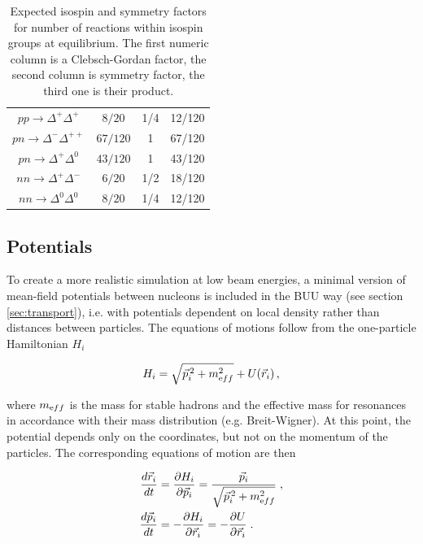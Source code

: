 \begin{table}
\begin{tabular}{cccc}
  $pp\to\Delta^{+}\Delta^{+}$        &  $      8/20$ &   1/4      &  12/120   \\
  $pn\to\Delta^{-}\Delta^{++}$       &  $    67/120$ &     1      &  67/120   \\
  $pn\to\Delta^{+}\Delta^{0}$        &  $    43/120$ &     1      &  43/120   \\
  $nn\to\Delta^{+}\Delta^{-}$        &  $      6/20$ &   1/2      &  18/120   \\
  $nn\to\Delta^{0}\Delta^{0}$        &  $      8/20$ &   1/4      &  12/120   \\
  \bottomrule
\end{tabular}
  \caption{Expected isospin and symmetry factors for number of reactions within
           isospin groups at equilibrium. The first numeric column is a Clebsch-Gordan
           factor, the second column is symmetry factor, the third one is their product.}
\label{tab:clebsch}
\end{table}



\subsection{Potentials} \label{sec:potentials}

To create a more realistic simulation at low beam energies, a minimal version
of mean-field potentials between nucleons is included in the BUU way (see
section \ref{sec:transport}), i.e. with potentials dependent on local density
rather than distances between particles. The equations of motions follow from the
one-particle Hamiltonian $H_i$

\begin{equation}
  H_i = \sqrt{\vec p_i^{\,2} + m_{\textrm eff}^2} + U(\vec r_i)\,,
\end{equation}

where $m_{\textrm eff}$ is the mass for stable hadrons and the effective mass for
resonances in accordance with their mass distribution (e.g. Breit-Wigner). At
this point, the potential depends only on the coordinates, but not on the
momentum of the particles. The corresponding equations of motion are then

\begin{align}
  \frac{d\vec r_i}{dt} &=  \frac{\partial H_i}{\partial \vec p_i} =
         \frac{\vec p_i}{\sqrt{\vec p_i^{\,2} + m_{\textrm eff}^2}} \; , \\
  \frac{d\vec p_i}{dt} &= -\frac{\partial H_i}{\partial \vec r_i} =
        -\frac{\partial U}{\partial \vec r_i} \; .
\end{align}

